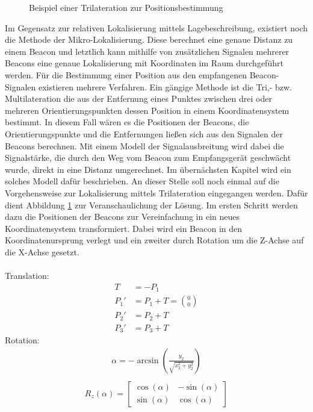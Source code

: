 \begin{figure}
\caption{Beispiel einer Trilateration zur Positionsbestimmung}
\label{fig:Trilat}
\end{figure}
Im Gegensatz zur relativen Lokalisierung mittels Lagebeschreibung, existiert noch die Methode der Mikro-Lokalisierung. Diese berechnet eine genaue Distanz zu einem Beacon und letztlich kann mithilfe von zusätzlichen Signalen mehrerer Beacons eine genaue Lokalisierung mit Koordinaten im Raum  durchgeführt werden. Für die Bestimmung einer Position aus den empfangenen Beacon-Signalen existieren mehrere Verfahren. Ein gängige Methode ist die Tri,- bzw. Multilateration die aus der Entfernung eines Punktes zwischen drei oder mehreren Orientierungspunkten dessen Position in einem Koordinatensystem bestimmt. In diesem Fall wären es die Positionen der Beacons, die Orientierungspunkte und die Entfernungen ließen sich aus den Signalen der Beacons berechnen. Mit einem Modell der Signalausbreitung wird dabei die Signalstärke, die durch den Weg vom Beacon zum Empfangsgerät geschwächt wurde, direkt in eine Distanz umgerechnet. Im übernächsten Kapitel wird ein solches Modell dafür beschrieben. An dieser Stelle soll noch einmal auf die Vorgehensweise zur Lokalisierung mittels Trilateration eingegangen werden. Dafür dient Abbildung \ref{fig:Trilat} zur Veranschaulichung der Lösung. Im ersten Schritt werden dazu die Positionen der Beacons zur Vereinfachung in ein neues Koordinatensystem transformiert. Dabei wird ein Beacon in den Koordinatenursprung verlegt und ein zweiter durch Rotation um die Z-Achse auf die X-Achse gesetzt.\\ \\
Translation:
\begin{align*}
T &= -P_1\\
P_1' &= P_1 + T = \binom{0}{0}\\
P_2' &= P_2 + T\\
P_3' &= P_3 + T
\end{align*} 
Rotation:
\begin{align*}
\alpha = -\arcsin \left ( \frac{y_2}{\sqrt{x_2^2+y_2^2}} \right )\\
\end{align*} 
\begin{align*}
R_z\left ( \alpha \right ) = \begin{bmatrix}
\cos\left ( \alpha \right ) & -\sin\left ( \alpha \right )\\ 
\sin\left ( \alpha \right ) & \cos\left ( \alpha \right )
\end{bmatrix}\\
\end{align*}
